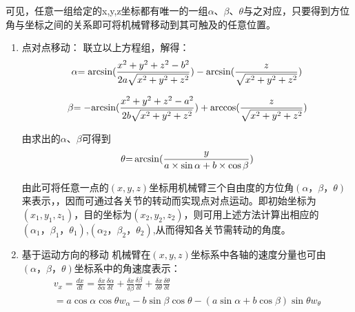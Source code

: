 可见，任意一组给定的x,y,z坐标都有唯一的一组$\alpha$、$\beta$、$\theta$与之对应，只要得到方位角与坐标之间的关系即可将机械臂移动到其可触及的任意位置。

\begin{enumerate}
\item 点对点移动：
联立以上方程组，解得：
\begin{displaymath}
\alpha {\rm{ = arcsin(}}\frac{{{x^2} + {y^2} + {z^2} - {b^2}}}{{2a\sqrt {{x^2} + {y^2} + {z^2}} }}) - {\rm{arcsin(}}\frac{z}{{\sqrt {{x^2} + {y^2} + {z^2}} }})
\end{displaymath}

\begin{displaymath}
\beta {\rm{ =  - arcsin(}}\frac{{{x^2} + {y^2} + {z^2} - {a^2}}}{{2b\sqrt {{x^2} + {y^2} + {z^2}} }}) + {\rm{arccos(}}\frac{z}{{\sqrt {{x^2} + {y^2} + {z^2}} }})
\end{displaymath}

由求出的$\alpha$、$\beta$可得到
\begin{equation}
\theta {\rm{ = }}\arcsin (\frac{y}{{a \times \sin \alpha  + b \times \cos \beta }})
\end{equation}

由此可将任意一点的$(x,y,z)$坐标用机械臂三个自由度的方位角$(\alpha，\beta，\theta)$来表示，，因而可通过各关节的转动而实现点对点运动。即初始坐标为$(x_1,y_1,z_1)$，目的坐标为$(x_2,y_2,z_2)$，则可用上述方法计算出相应的$(\alpha_1，\beta_1，\theta_1)$,$(\alpha_2，\beta_2，\theta_2)$,从而得知各关节需转动的角度。

\item 基于运动方向的移动
机械臂在$(x,y,z)$坐标系中各轴的速度分量也可由$(\alpha，\beta，\theta)$坐标系中的角速度表示：
\begin{displaymath}
\begin{array}{l}
{v_x} = \frac{{dx}}{{dt}} = \frac{{\delta x}}{{\delta \alpha }}\frac{{\delta \alpha }}{{\delta t}} + \frac{{\delta x}}{{\delta \beta }}\frac{{\delta \beta }}{{\delta t}} + \frac{{\delta x}}{{\delta \theta }}\frac{{\delta \theta }}{{\delta t}} \\= a\cos \alpha \cos \theta {w_\alpha } - b\sin \beta \cos \theta  - (a\sin \alpha  + b\cos \beta )\sin \theta {w_\theta }\\


\end{array}
\end{displaymath}
\end{enumerate}
